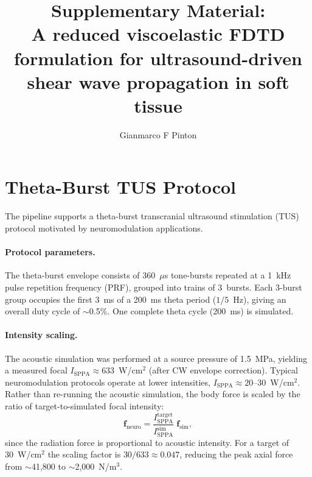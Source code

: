\documentclass[11pt]{article}
\title{Supplementary Material:\\
A reduced viscoelastic FDTD formulation for ultrasound-driven shear wave
propagation in soft tissue}
\author{Gianmarco F Pinton}
\date{}
\begin{document}
\maketitle

\setcounter{section}{0}
\renewcommand{\thesection}{S\arabic{section}}
\renewcommand{\thesubsection}{S\arabic{section}.\arabic{subsection}}
\renewcommand{\thefigure}{S\arabic{figure}}
\renewcommand{\thetable}{S\arabic{table}}
\renewcommand{\theequation}{S\arabic{equation}}

\section{Theta-Burst TUS Protocol}
\label{sec:supp_theta_burst}

The pipeline supports a theta-burst transcranial ultrasound stimulation (TUS)
protocol motivated by neuromodulation applications.

\paragraph{Protocol parameters.}
The theta-burst envelope consists of 360~$\mu$s tone-bursts repeated at a
1~kHz pulse repetition frequency (PRF), grouped into trains of 3~bursts. Each
3-burst group occupies the first 3~ms of a 200~ms theta period ($1/5$~Hz),
giving an overall duty cycle of ${\sim}$0.5\%. One complete theta cycle (200~ms)
is simulated.

\paragraph{Intensity scaling.}
The acoustic simulation was performed at a source pressure of 1.5~MPa, yielding
a measured focal $I_{\mathrm{SPPA}} \approx 633$~W/cm$^2$ (after CW envelope
correction). Typical neuromodulation protocols operate at lower intensities,
$I_{\mathrm{SPPA}} \approx 20$--$30$~W/cm$^2$. Rather than re-running the
acoustic simulation, the body force is scaled by the ratio of target-to-simulated
focal intensity:
\begin{equation}
  \bm{f}_{\mathrm{neuro}} = \frac{I_{\mathrm{SPPA}}^{\mathrm{target}}}
                                  {I_{\mathrm{SPPA}}^{\mathrm{sim}}}
                            \;\bm{f}_{\mathrm{sim}},
  \label{eq:arf_scaling}
\end{equation}
since the radiation force is proportional to acoustic intensity. For a target of
30~W/cm$^2$ the scaling factor is $30/633 \approx 0.047$, reducing the peak
axial force from ${\sim}$41{,}800 to ${\sim}$2{,}000~N/m$^3$.
\end{document}
